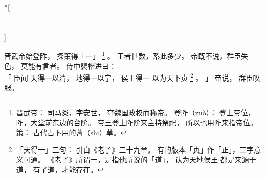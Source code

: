 
\switchcolumn[0]*[\section{}]

晋武帝始登阼，
探策得「一」%
\footnote{%
    晋武帝：
        司马炎，字安世，
        夺魏国政权而称帝。
    登阼（zuò）：
        登上帝位，
        阼，大堂前东边的台阶。
        帝王登上阼阶来主持祭祀，
        所以也用阼来指帝位。
    策：
        古代占卜用的蓍（shī）草。
}%
。
王者世数，系此多少。
帝既不说，群臣失色，
莫能有言者。
侍中裴楷进曰：\\「
    臣闻
    天得一以清，
    地得一以宁，
    侯王得一
    以为天下贞%
    \footnote{%
        「天得一」三句：
            引白《老子》三十九章。
            有的版本「贞」作「正」，二字意义可通。
            《老子》所谓一，是指他所说的「道」，
            认为天地侯王
            都是来源于道，
            有了道，才能存在。
    }%
    。
」
帝说，
群臣叹服。

\switchcolumn




